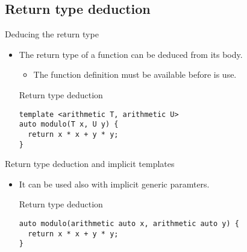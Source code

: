 \subsection{Return type deduction} 

\begin{frame}[t,fragile]{Deducing the return type}
\begin{itemize}
  \item The return type of a function can be deduced from its body.
    \begin{itemize}
      \item The function definition must be available before is use.
    \end{itemize}

\begin{block}{Return type deduction}
\begin{lstlisting}
template <arithmetic T, arithmetic U>
auto modulo(T x, U y) {
  return x * x + y * y;
}
\end{lstlisting}
\end{block}

\end{itemize}
\end{frame}

\begin{frame}[t,fragile]{Return type deduction and implicit templates}
\begin{itemize}
  \item It can be used also with implicit generic paramters.

\begin{block}{Return type deduction}
\begin{lstlisting}
auto modulo(arithmetic auto x, arithmetic auto y) {
  return x * x + y * y;
}
\end{lstlisting}
\end{block}

\end{itemize}
\end{frame}

